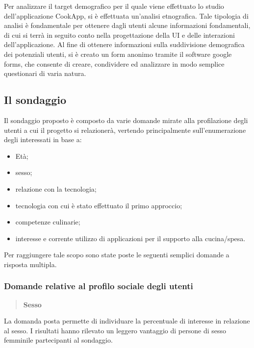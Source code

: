 Per analizzare il target demografico per il quale viene effettuato lo studio dell'applicazione CookApp, 
si è effettuata un'analisi etnografica. Tale tipologia di analisi è fondamentale per ottenere dagli utenti
alcune informazioni fondamentali, di cui si terrà in seguito conto nella progettazione della UI e delle interazioni 
dell'applicazione. Al fine di ottenere informazioni sulla suddivisione demografica dei potenziali utenti, si è creato
un form anonimo tramite il software google forms\cite{GoogleModules}, che consente di creare, condividere ed analizzare in modo semplice
questionari di varia natura.

\subsection{Il sondaggio}
Il sondaggio proposto è composto da varie domande mirate alla
profilazione degli utenti a cui il progetto si relazionerà, vertendo
principalmente sull'enumerazione degli interessati in base a:
\begin{itemize}
	\item Età;
	\item sesso;
	\item relazione con la tecnologia;
	\item tecnologia con cui è stato effettuato il primo approccio;
	\item competenze culinarie;
	\item interesse e corrente utilizzo di applicazioni per il supporto alla
	cucina/spesa.
\end{itemize}

Per raggiungere tale scopo sono state poste le seguenti semplici domande a
risposta multipla.

\subsubsection{Domande relative al profilo sociale degli utenti}
\begin{quote}
	\textbf{Sesso}
\end{quote}
La domanda posta permette di individuare la percentuale di interesse in
relazione al sesso.  I risultati hanno rilevato un leggero vantaggio di persone
di sesso femminile partecipanti al sondaggio.

